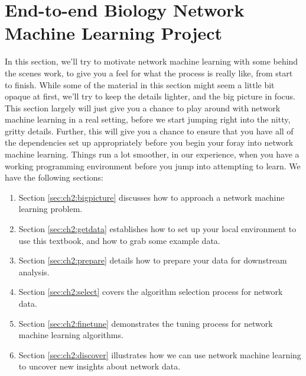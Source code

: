 \chapter{End-to-end Biology Network Machine Learning Project}
\label{sec:ch2}

In this section, we'll try to motivate network machine learning with some behind the scenes work, to give you a feel for what the process is really like, from start to finish. While some of the material in this section might seem a little bit opaque at first, we'll try to keep the details lighter, and the big picture in focus. This section largely will just give you a chance to play around with network machine learning in a real setting, before we start jumping right into the nitty, gritty details. Further, this will give you a chance to ensure that you have all of the dependencies set up appropriately before you begin your foray into network machine learning. Things run a lot smoother, in our experience, when you have a working programming environment before you jump into attempting to learn. We have the following sections:
\begin{enumerate}
    \item Section \ref{sec:ch2:bigpicture} discusses how to approach a network machine learning problem.
    \item Section \ref{sec:ch2:getdata} establishes how to set up your local environment to use this textbook, and how to grab some example data. 
    \item Section \ref{sec:ch2:prepare} details how to prepare your data for downstream analysis.
    \item Section \ref{sec:ch2:select} covers the algorithm selection process for network data.
    \item Section \ref{sec:ch2:finetune} demonstrates the tuning process for network machine learning algorithms.
    \item Section \ref{sec:ch2:discover} illustrates how we can use network machine learning to uncover new insights about network data.
\end{enumerate}

\newpage 









